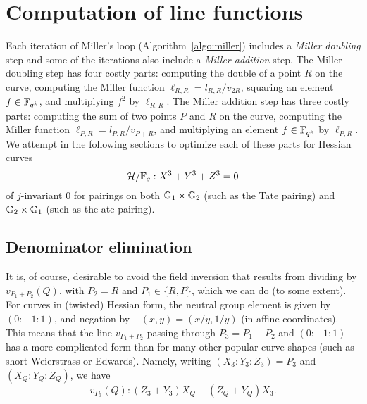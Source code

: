 \section{Computation of line functions}
\label{sec:lines}

Each iteration of Miller's loop (Algorithm~\ref{algo:miller}) includes a 
\emph{Miller doubling} step and some of the iterations also include a
\emph{Miller addition} step. 
The Miller doubling step has four costly parts:
computing the double of a point $R$ on the curve, computing the 
Miller function
$\ell_{R,R} = l_{R,R}/v_{2R}$, squaring an element $f \in \mathbb{F}_{q^k}$, 
and multiplying $f^2$ by $\ell_{R,R}$. 
The Miller addition step has three costly parts:
computing the sum of two points $P$ and $R$ on the curve, 
computing the Miller function
$\ell_{P,R} = l_{P,R}/v_{P+R}$,
and multiplying an element $f \in \mathbb{F}_{q^k}$ by $\ell_{P,R}$. 
We attempt in the following sections to optimize each of these parts
for
Hessian curves 
\[\mathcal{H}/\mathbb{F}_{q}: X^3 + Y^3 + Z^3 = 0\]
of $j$-invariant 0 
for pairings on both $\mathbb{G}_{1} \times \mathbb{G}_{2}$ (such as the Tate pairing)
and $\mathbb{G}_{2} \times \mathbb{G}_{1}$ (such as the ate pairing).


\subsection{Denominator elimination}\label{denelim}

It is, of course, desirable to avoid the field inversion that results from dividing by 
$v_{P_1 + P_2}(Q)$, with $P_2 = R$ and $P_1 \in \{R,P\}$, which we can do (to some extent).
For curves in (twisted) Hessian form, the neutral group element is given by 
$(0:-1:1)$,
and negation by
$-(x,y) = (x/y,1/y)$
(in affine coordinates). 
This means that the line $v_{P_1 + P_2}$
passing through $P_3 = P_1 + P_2$ and $(0:-1:1)$ has a more complicated form than for many other popular curve shapes (such as
short Weierstrass or Edwards).
Namely, writing 
$(X_3:Y_3:Z_3) = P_3$ and $(X_Q:Y_Q:Z_Q)$, we have
\[v_{P_3}(Q): (Z_3 + Y_3)X_Q - (Z_Q+Y_Q)X_3.\]

